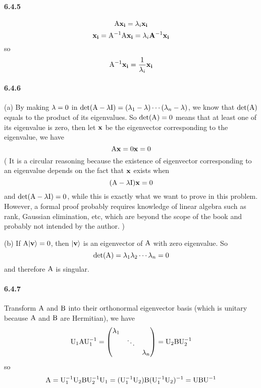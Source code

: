\documentclass[a4paper]{article}
\begin{document}
\paragraph{6.4.5}
\[
\mathrm{A}\mathbf{x_i}=\lambda_i\mathbf{x_i}
\]
\[
\mathbf{x_i}=\mathrm{A}^{-1}\mathrm{A}\mathbf{x_i}=\lambda_i\mathbf{A}^{-1}\mathbf{x_i}
\]
so
\[
\mathrm{A}^{-1}\mathbf{x_i}=\frac{1}{\lambda_i}\mathbf{x_i}
\]

\paragraph{6.4.6}
(a) By making $\lambda=0$ in $\det(\mathrm{A}-\lambda\mathrm{I})=(\lambda_1-\lambda)\cdots(\lambda_n-\lambda)$, we know that $\det(\mathrm{A})$ equals to the product of its eigenvalues. So $\det(\mathrm{A})=0$ means that at least one of its eigenvalue is zero, then let $\mathbf{x}$ be the eigenvector corresponding to the eigenvalue, we have
\[
\mathrm{A}\mathbf{x}=0\mathbf{x}=0
\]
(
It is a circular reasoning because the existence of eigenvector corresponding to an eigenvalue depends on the fact that $\mathbf{x}$ exists when
\[
(\mathrm{A}-\lambda\mathrm{I})\mathbf{x}=0
\]
and $\det(\mathrm{A}-\lambda\mathrm{I})=0$, while this is exactly what we want to prove in this problem. However, a formal proof probably requires knowledge of linear algebra such as rank, Gaussian elimination, etc, which are beyond the scope of the book and probably not intended by the author.
)

(b) If $\mathrm{A}|\mathbf{v}\rangle=0$, then $|\mathbf{v}\rangle$ is an eigenvector of $\mathrm{A}$ with zero eigenvalue. So
\[
\det(\mathrm{A})=\lambda_1\lambda_2\cdots\lambda_n=0
\]
and therefore $\mathrm{A}$ is singular.

\paragraph{6.4.7}
\renewcommand{\arraystretch}{1.0}
Transform $\mathrm{A}$ and $\mathrm{B}$ into their orthonormal eigenvector basis (which is unitary because $\mathrm{A}$ and $\mathrm{B}$ are Hermitian), we have
\[
\mathrm{U}_1\mathrm{A}\mathrm{U}_1^{-1}=
\begin{pmatrix}
\lambda_1&&\\
 &\ddots& \\
  & &\lambda_n
\end{pmatrix}=
\mathrm{U}_2\mathrm{B}\mathrm{U}_2^{-1}
\]
so
\[
\mathrm{A}=\mathrm{U}_1^{-1}\mathrm{U}_2\mathrm{B}\mathrm{U}_2^{-1}\mathrm{U}_1
=(\mathrm{U}_1^{-1}\mathrm{U}_2)\mathrm{B}(\mathrm{U}_1^{-1}\mathrm{U}_2)^{-1}=\mathrm{U}\mathrm{B}\mathrm{U}^{-1}
\]
\end{document}
